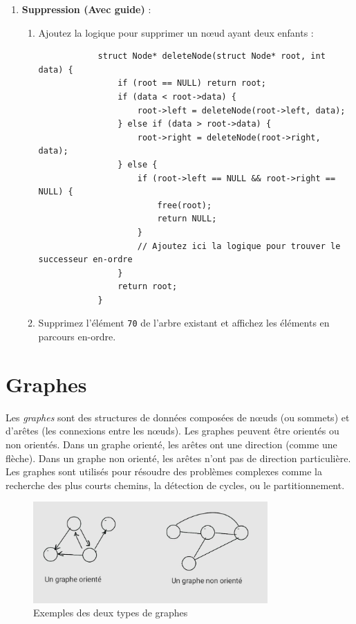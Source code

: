 \begin{enumerate}
	\item \textbf{Suppression (Avec guide)} :
	\begin{enumerate}
		\item Ajoutez la logique pour supprimer un nœud ayant deux enfants :
		\begin{verbatim}
			struct Node* deleteNode(struct Node* root, int data) {
				if (root == NULL) return root;
				if (data < root->data) {
					root->left = deleteNode(root->left, data);
				} else if (data > root->data) {
					root->right = deleteNode(root->right, data);
				} else {
					if (root->left == NULL && root->right == NULL) {
						free(root);
						return NULL;
					}
					// Ajoutez ici la logique pour trouver le successeur en-ordre
				}
				return root;
			}
		\end{verbatim}
		\item Supprimez l’élément \texttt{70} de l’arbre existant et affichez les éléments en parcours en-ordre.
	\end{enumerate}
\end{enumerate}



\section{Graphes}

Les \emph{graphes} sont des structures de données composées de nœuds (ou sommets) et d'arêtes (les connexions entre les nœuds). Les graphes peuvent être orientés ou non orientés. Dans un graphe orienté, les arêtes ont une direction (comme une flèche). Dans un graphe non orienté, les arêtes n'ont pas de direction particulière. Les graphes sont utilisés pour résoudre des problèmes complexes comme la recherche des plus courts chemins, la détection de cycles, ou le partitionnement.

\begin{figure}[H]
	\centering
	 \includegraphics[width=0.8\textwidth]{image/graph}  %
	\caption{Exemples des deux types de graphes}
\end{figure}

